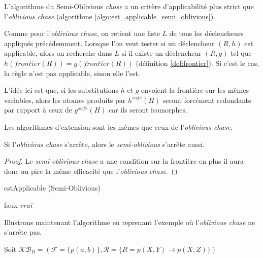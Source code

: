 
L'algorithme du Semi-Oblivious \textit{chase} a un critère d'applicabilité plus strict que l'\textit{oblivious chase} (algorithme \ref{algo:est_applicable_semi_oblivious}). 
\par Comme pour l'\textit{oblivious chase}, on retient une liste $L$ de tous les déclencheurs appliqués précédemment. Lorsque l'on veut tester si un déclencheur $(R,h)$ est applicable, alors on recherche dans $L$ si il existe un déclencheur $(R,g)$ tel que $h(frontier(R)) = g(frontier(R))$ (définition \ref{def:frontier}). Si c'est le cas, la règle n'est pas applicable, sinon elle l'est.
\par L'idée ici est que, si les substitutions $h$ et $g$ envoient la frontière sur les mêmes variables, alors les atomes produits par $h^{safe}(H)$ seront forcément redondants par rapport à ceux de $g^{safe}(H)$ car ils seront isomorphes.
\par Les algorithmes d'extension sont les mêmes que ceux de l'\textit{oblivious chase}.

\begin{proposition}
    Si l'\textit{oblivious chase} s'arrête, alors le \textit{semi-oblivious} s'arrête aussi.
\end{proposition}

\begin{proof} Le \textit{semi-oblivious chase} a une condition sur la frontière en plus il aura donc au pire la même efficacité que l'\textit{oblivious chase}.
\end{proof}

\begin{algorithm}[H]\label{algo:est_applicable_semi_oblivious}
\caption{estApplicable (Semi-Oblivious)}
\SetAlgoLined
\DontPrintSemicolon
{}
    {
        \Return faux
    }
\Return $vrai$
\end{algorithm}
Illustrons maintenant l'algorithme en reprenant l'exemple où l'\textit{oblivious chase} ne s'arrête pas.
\par Soit $\mathcal{KB}_B = (\mathcal{F} = \{p(a,b)\}, \mathcal{R} = \{R = p(X,Y) \rightarrow p(X,Z) \})$

